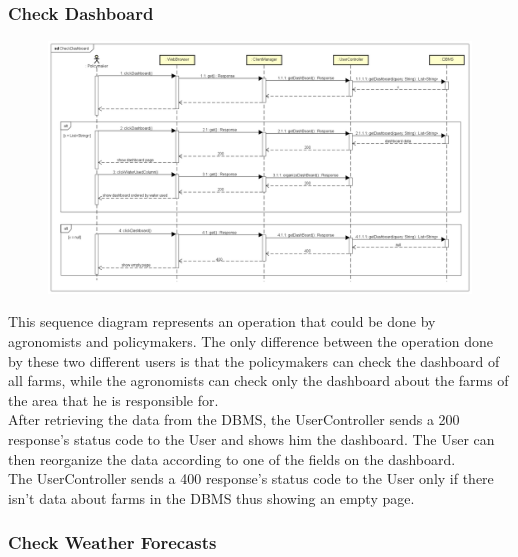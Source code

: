 \newpage
\subsubsection{Check Dashboard}

\begin{figure}[H]
    \begin{center}
        \includegraphics[width=\textwidth]{Images/SequenceDiagrams/CheckDashboardDD.png}
    \end{center}
\end{figure}

This sequence diagram represents an operation that could be done by agronomists and policymakers. 
The only difference between the operation done by these two different users is that the policymakers can check the dashboard 
of all farms, while the agronomists can check only the dashboard about the farms of the area that he is responsible for.\\
After retrieving the data from the DBMS, the UserController sends a 200 response's status code to the User and shows him the dashboard. 
The User can then reorganize the data according to one of the fields on the dashboard.\\
The UserController sends a 400 response's status code to the User only 
if there isn't data about farms in the DBMS thus showing an empty page.


\newpage
\subsubsection{Check Weather Forecasts}

